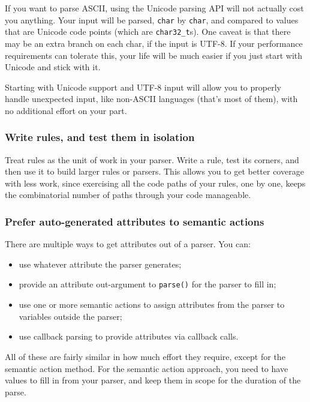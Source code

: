 If you want to parse ASCII, using the Unicode parsing API will not actually cost you anything. Your input will be parsed, \texttt{char} by \texttt{char}, and compared to values that are Unicode code points (which are \texttt{char32\_t}s). One caveat is that there may be an extra branch on each char, if the input is UTF-8. If your performance requirements can tolerate this, your life will be much easier if you just start with Unicode and stick with it.

Starting with Unicode support and UTF-8 input will allow you to properly handle unexpected input, like non-ASCII languages (that's most of them), with no additional effort on your part.

\subsubsection{Write rules, and test them in isolation}

Treat rules as the unit of work in your parser. Write a rule, test its corners, and then use it to build larger rules or parsers. This allows you to get better coverage with less work, since exercising all the code paths of your rules, one by one, keeps the combinatorial number of paths through your code manageable.

\subsubsection{Prefer auto-generated attributes to semantic actions}

There are multiple ways to get attributes out of a parser. You can:

\begin{itemize}
\item
  use whatever attribute the parser generates;
\item
  provide an attribute out-argument to \texttt{parse()} for the parser to fill in;
\item
  use one or more semantic actions to assign attributes from the parser to variables outside the parser;
\item
  use callback parsing to provide attributes via callback calls.
\end{itemize}

All of these are fairly similar in how much effort they require, except for the semantic action method. For the semantic action approach, you need to have values to fill in from your parser, and keep them in scope for the duration of the parse.

